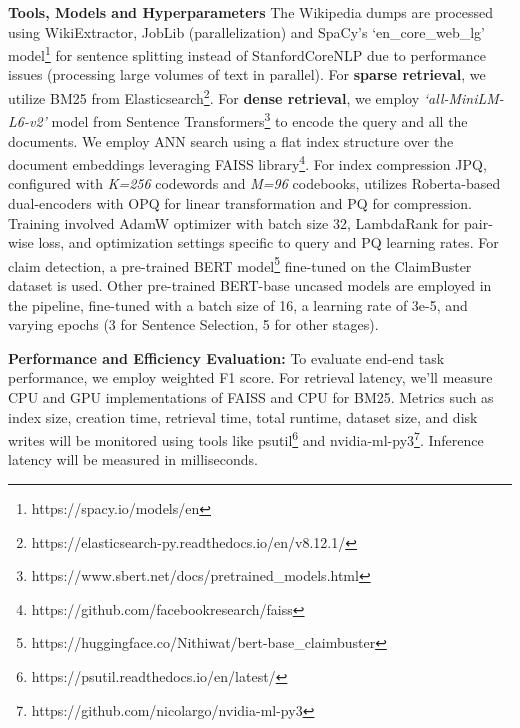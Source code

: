 \noindent \textbf{Tools, Models and Hyperparameters} The Wikipedia dumps are processed using WikiExtractor, JobLib (parallelization) and SpaCy's `en\_core\_web\_lg' model\footnote{https://spacy.io/models/en} for sentence splitting instead of StanfordCoreNLP due to performance issues (processing large volumes of text in parallel). For \textbf{sparse retrieval}, we utilize BM25 from Elasticsearch\footnote{https://elasticsearch-py.readthedocs.io/en/v8.12.1/}. For \textbf{dense retrieval}, we employ \textit{`all-MiniLM-L6-v2'} model from Sentence Transformers\footnote{https://www.sbert.net/docs/pretrained\_models.html} to encode the query and all the documents. We employ ANN search using a flat index structure over the document embeddings leveraging FAISS library\footnote{https://github.com/facebookresearch/faiss}.
 For index compression JPQ, configured with \textit{K=256} codewords and \textit{M=96} codebooks, utilizes Roberta-based dual-encoders with OPQ for linear transformation and PQ for compression. Training involved AdamW optimizer with batch size 32, LambdaRank for pair-wise loss, and optimization settings specific to query and PQ learning rates. For claim detection, a pre-trained BERT model\footnote{https://huggingface.co/Nithiwat/bert-base\_claimbuster} fine-tuned on the ClaimBuster dataset is used. Other pre-trained BERT-base uncased models are employed in the pipeline, fine-tuned with a batch size of 16, a learning rate of 3e-5, and varying epochs (3 for Sentence Selection, 5 for other stages).


\noindent \textbf{Performance and Efficiency Evaluation:} To evaluate end-end task performance, we employ weighted F1 score. For retrieval latency, we'll measure CPU and GPU implementations of FAISS and CPU for BM25. Metrics such as index size, creation time, retrieval time, total runtime, dataset size, and disk writes will be monitored using tools like psutil\footnote{https://psutil.readthedocs.io/en/latest/} and nvidia-ml-py3\footnote{https://github.com/nicolargo/nvidia-ml-py3}. Inference latency will be measured in milliseconds.



